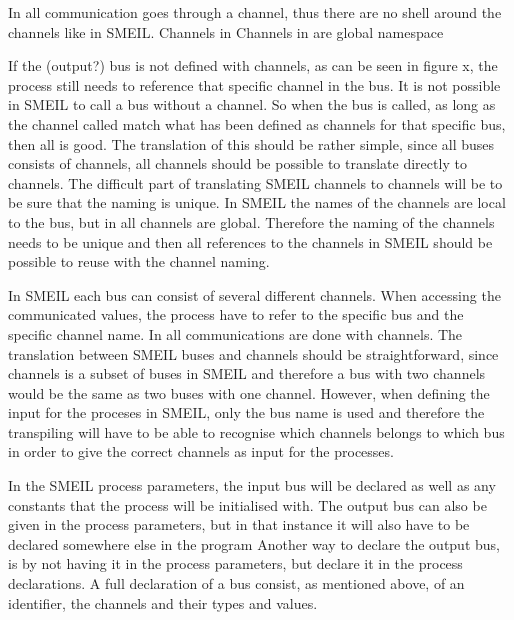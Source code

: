 In \cspm all communication goes through a channel, thus there are no shell around the channels like in SMEIL.
Channels in \cspm %
Channels in \cspm are global namespace %




If the (output?) bus is not defined with channels, as can be seen in figure x,
the process still needs to reference that specific channel in the bus. It is not possible in SMEIL to call a bus without a channel. So when the bus is called, as long as the channel called match what has been defined as channels for that specific bus, then all is good. The translation of this should be rather simple, since all buses consists of channels, all channels should be possible to translate directly to \cspm channels.
The difficult part of translating SMEIL channels to \cspm channels will be to be sure that the naming is unique. In SMEIL the names of the channels are local to the bus, but in \cspm all channels are global. Therefore the naming of the channels needs to be unique and then all references to the channels in SMEIL should be possible to reuse with the \cspm channel naming.


In SMEIL each bus can consist of several different channels. When accessing the communicated values, the process have to refer to the specific bus and the specific channel name. In \cspm all communications are done with channels. The translation between SMEIL buses and \cspm channels should be straightforward, since channels is a subset of buses in SMEIL and therefore a bus with two channels would be the same as two buses with one channel. However, when defining the input for the proceses in SMEIL, only the bus name is used and therefore the transpiling will have to be able to recognise which channels belongs to which bus in order to give the correct channels as input for the \cspm processes.



In the SMEIL process parameters, the input bus will be declared as well as any constants that the process will be initialised with. The output bus can also be given in the process parameters, but in that instance it will also have to be declared somewhere else in the program
Another way to declare the output bus, is by not having it in the process parameters, but declare it in the process declarations.
A full declaration of a bus consist, as mentioned above, of an identifier, the channels and their types and values.

